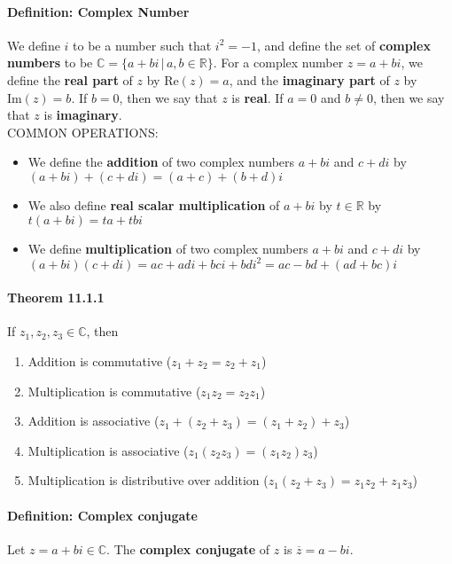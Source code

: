 \documentclass[10pt,letter]{article}
\begin{document}
\paragraph{Definition: Complex Number}
We define $i$ to be a number such that $i^2=-1$, and define the set of \textbf{complex numbers} to be $\mathbb{C}=\{a+bi\,|\,a,b\in\mathbb{R}\}$. For a complex number $z=a+bi$, we define the \textbf{real part} of $z$ by $\text{Re}(z)=a$, and the \textbf{imaginary part} of $z$ by $\text{Im}(z)=b$. If $b=0$, then we say that $z$ is \textbf{real}. If $a=0$ and $b\neq0$, then we say that $z$ is \textbf{imaginary}. \\ 
COMMON OPERATIONS:\begin{itemize}
    \item We define the \textbf{addition} of two complex numbers $a+bi$ and $c+di$ by $(a+bi)+(c+di)=(a+c)+(b+d)i$ 
    \item We also define \textbf{real scalar multiplication} of $a+bi$ by $t\in\mathbb{R}$ by $t(a+bi)=ta+tbi$ 
    \item We define \textbf{multiplication} of two complex numbers $a+bi$ and $c+di$ by $(a+bi)(c+di)=ac+adi+bci+bdi^2=ac-bd+(ad+bc)i$
\end{itemize}
\paragraph{Theorem 11.1.1}
If $z_1,z_2,z_3\in\mathbb{C}$, then 
\begin{enumerate}
    \item Addition is commutative ($z_1+z_2=z_2+z_1$)
    \item Multiplication is commutative ($z_1z_2=z_2z_1$)
    \item Addition is associative ($z_1+(z_2+z_3)=(z_1+z_2)+z_3$)
    \item Multiplication is associative ($z_1(z_2z_3)=(z_1z_2)z_3$)
    \item Multiplication is distributive over addition ($z_1(z_2+z_3)=z_1z_2+z_1z_3$)
\end{enumerate}
\paragraph{Definition: Complex conjugate}
Let $z=a+bi\in\mathbb{C}$. The \textbf{complex conjugate} of $z$ is $\overline{z}=a-bi$. 
\end{document}
